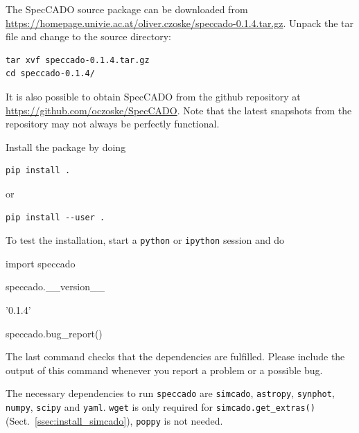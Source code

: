 \documentclass[a4paper,twoside,11pt]{article}
\begin{document}
The SpecCADO source package can be downloaded from
\url{https://homepage.univie.ac.at/oliver.czoske/speccado-0.1.4.tar.gz}. Unpack
the tar file and change to the source directory:
\begin{lstlisting}[style=csh]
tar xvf speccado-0.1.4.tar.gz
cd speccado-0.1.4/
\end{lstlisting}
It is also possible to obtain SpecCADO from the github repository at
\url{https://github.com/oczoske/SpecCADO}. Note that the latest
snapshots from the repository may not always be perfectly functional.

Install the package by doing
\begin{lstlisting}[style=csh]
pip install .
\end{lstlisting}
or
\begin{lstlisting}[style=csh]
pip install --user .
\end{lstlisting}

To test the installation, start a \lstinline{python} or
\lstinline{ipython} session and do
\begin{pyin}
  import speccado
\end{pyin}

\begin{pyin}
speccado.__version__
\end{pyin}
\begin{pyout}
'0.1.4'
\end{pyout}
\begin{pyin}
speccado.bug_report()
\end{pyin}

The last command checks that the dependencies are fulfilled. Please
include the output of this command whenever you report a problem or a
possible bug.

The necessary dependencies to run \lstinline{speccado} are
\lstinline{simcado}, \lstinline{astropy}, \lstinline{synphot},
\lstinline{numpy}, \lstinline{scipy} and
\lstinline{yaml}. \lstinline{wget} is only required for
\lstinline{simcado.get_extras()} (Sect.~\ref{ssec:install_simcado}),
\lstinline{poppy} is not needed.
\end{document}
